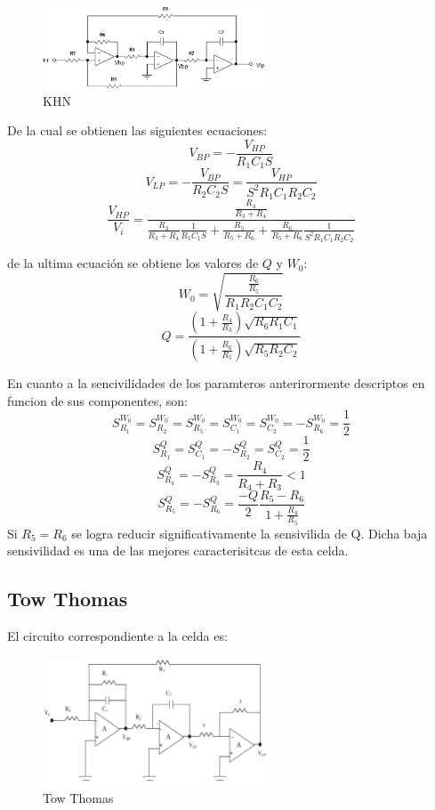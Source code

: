 \documentclass[../../tc_tp5_main.tex]{subfiles}
\begin{document}
\begin{figure}[H]	
	\centering
	\includegraphics[width=0.6\textwidth]{imagenes/KHN.png}
	\caption{KHN}
\end{figure}

De la cual se obtienen las siguientes ecuaciones:
$$ V_{BP}=- \frac{V_{HP}}{R_1 C_1  S} $$
$$ V_{LP}= - \frac{V_{BP}}{R_2 C_2 S}=\frac{V_{HP}}{S^2 R_1 C_1 R_2 C_2} $$
$$\frac{V_{HP}}{V_i}=  \frac{\frac{R_4}{R_3 + R_4}}{\frac{R_3}{R_3 + R_4} \frac{1}{R_1 C_1 S} + \frac{R_5}{R_5 + R_6} + \frac{R_6}{R_5 +R_6}\frac{1}{S^2 R_1 C_1 R_2 C_2} }$$

de la ultima ecuación se obtiene los valores de $Q$ y $W_0$:
$$W_0=\sqrt{\frac{\frac{R_6}{R_5}}{R_1 R_2 C_1 C_2}} $$
$$ Q=\frac{\left( 1+\frac{R_4}{R_3} \right) \sqrt{R_6 R_1 C_1}}{\left( 1 + \frac{R_6}{R_5} \right) \sqrt{R_5 R_2 C_2} } $$

En cuanto a la sencivilidades de los paramteros anterirormente descriptos en funcion de sus componentes, son:
$$ S_{R_1}^{W_0}=S_{R_2}^{W_0}=S_{R_5}^{W_0}=S_{C_1}^{W_0}=S_{C_2}^{W_0}=-S_{R_6}^{W_0}=\frac{1}{2} $$
$$ S_{R_1}^{Q}=S_{C_1}^{Q}= -S_{R_2}^{Q}=S_{C_2}^{Q}=\frac{1}{2}$$
$$ S_{R_4}^{Q}=-S_{R_3}^{Q}=\frac{R_4}{R_4 +R_3} < 1$$
$$ S_{R_5}^{Q}=-S_{R_6}^{Q}=\frac{-Q}{2}\frac{R_5 - R_6}{1 + \frac{R_4}{R_5}} $$
Si $R_5=R_6$ se logra reducir significativamente la sensivilida de Q. Dicha baja sensivilidad es una de las mejores caracterisitcas de esta celda.



\subsection{Tow Thomas}
El circuito correspondiente a la celda es:
\begin{figure}[H]	
	\centering
	\includegraphics[width=0.6\textwidth]{imagenes/tt.png}
	\caption{Tow Thomas}
\end{figure}
\end{document}
